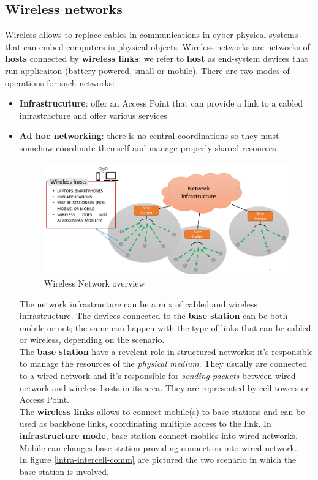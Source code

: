 \documentclass[10pt,a4paper]{report}
\theoremstyle{definition}
\begin{document}
\subsection{Wireless networks}\label{sec:wireless-networks}
Wireless allows to replace cables in communications in cyber-physical systems that can embed computers in physical objects.
Wireless networks are networks of \textbf{hosts} connected by \textbf{wireless  links}: we refer to \textbf{host} as end-system devices that run applicaiton (battery-powered, small or mobile).
There are two modes of operations for such networks:
\begin{itemize}
	\item 
	\textbf{Infrastrucuture}: offer an Access Point that can provide a link to a cabled infrastracture and offer various services
	\item 
	\textbf{Ad hoc networking}: there is no central coordinations so they must somehow coordinate themself and manage properly shared resources
	\begin{figure}[h!]
		\centering\includegraphics[scale=0.50]{images/Pasted image 20230224162943.png}
		\caption{Wireless Network overview}
\end{figure}
	
The network infrastructure can be a mix of cabled and wireless infrastructure. The devices connected to the \textbf{base station} can be both mobile or not; the same can happen with the type of links that can be cabled or wireless, depending on the scenario.\\
The \textbf{base station} have a revelent role in structured networks: it's responsible to manage the resources of the \textit{physical medium}. They usually are connected to a wired network and it's responsible for \textit{sending packets} between wired network and wireless hosts in its area. They are represented by cell towers or Access Point.\\
The \textbf{wireless  links} allows to connect mobile(s) to base stations and can be used as backbone links, coordinating multiple access to the link. In \textbf{infrastructure mode}, base station connect mobiles into wired networks. Mobile can changes base station providing connection into wired network.\\
In figure \ref{intra-intercell-comm} are pictured the two scenario in which the base station is involved.


\end{itemize}
\end{document}
